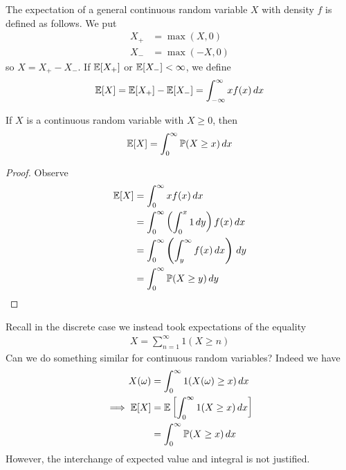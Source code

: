 \documentclass{../template/note}
\begin{document}
    \begin{definition}
        The expectation of a general continuous random variable \(X\) with density \(f\) is defined as follows. We put
        \begin{align*}
            X_+ &= \max(X, 0) \\
            X_- &= \max(-X, 0)
        \end{align*}
        so \(X = X_+ - X_-\). If \(\mathbb E[X_+]\) or \(\mathbb E[X_-] < \infty\), we define
        \begin{align*}
            \mathbb E[X] = \mathbb E[X_+] - \mathbb E[X_-] = \int_{-\infty}^\infty xf(x) \,d{x}
        \end{align*}
    \end{definition}
    
    \begin{lemma}
        If \(X\) is a continuous random variable with \(X \geq 0\), then
        \begin{align*}
            \mathbb E[X] = \int_0^\infty \mathbb P(X \geq x) \,d{x}
        \end{align*}
    \end{lemma}
    
    \begin{proof}
        Observe
        \begin{align*}
            \mathbb E[X] &= \int_0^\infty xf(x) \,d{x} \\
            &= \int_0^\infty \left(\int_0^x 1 \,d{y}\right) f(x) \,d{x} \\
            &= \int_0^\infty \left(\int_y^\infty f(x) \,d{x}\right) \,d{y} \\
            &= \int_0^\infty\mathbb P(X \geq y) \,d{y}
        \end{align*}
    \end{proof}
    
    \begin{remark*}
        Recall in the discrete case we instead took expectations of the equality
        \begin{align*}
            X = \sum_{n=1}^\infty 1(X \geq n)
        \end{align*}
        Can we do something similar for continuous random variables? Indeed we have
        \begin{align*}
            X(\omega) &= \int_0^\infty 1(X(\omega) \geq x) \,d{x} \\
            \implies \mathbb E[X] &= \mathbb E\left[\int_0^\infty 1(X \geq x) \,d{x}\right] \\
            &= \int_0^\infty \mathbb P(X \geq x) \,d{x}
        \end{align*}
        However, the interchange of expected value and integral is not justified.     
    \end{remark*}
    
\end{document}
